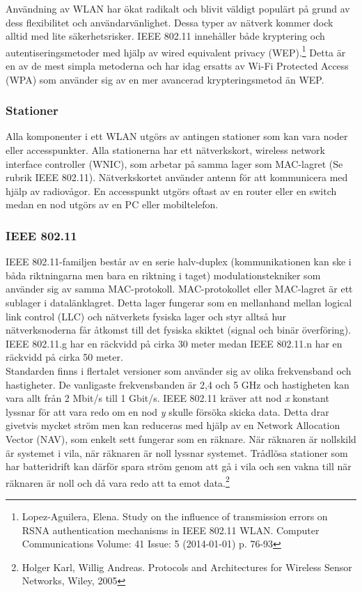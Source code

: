 \documentclass[a4paper,12pt,fleqn]{article}
\begin{document}
Användning av WLAN har ökat radikalt och blivit väldigt populärt på grund av dess flexibilitet och användarvänlighet. Dessa typer av nätverk kommer dock alltid med lite säkerhetsrisker. IEEE 802.11 innehåller både kryptering och autentiseringsmetoder med hjälp av wired equivalent privacy (WEP).\footnote{Lopez-Aguilera, Elena. Study on the influence of transmission errors on RSNA authentication mechanisms in IEEE 802.11 WLAN. Computer Communications Volume: 41 Issue: 5 (2014-01-01) p. 76-93} Detta är en av de mest simpla metoderna och har idag ersatts av  Wi-Fi Protected Access (WPA) som använder sig av en mer avancerad krypteringsmetod än WEP.

\subsubsection{Stationer}
Alla komponenter i ett WLAN utgörs av antingen stationer som kan vara noder eller accesspunkter. Alla stationerna har ett nätverkskort, wireless network interface controller (WNIC), som arbetar på samma lager som MAC-lagret (Se rubrik IEEE 802.11). Nätverkskortet använder antenn för att kommunicera med hjälp av radiovågor. En accesspunkt utgörs oftast av en router eller en switch medan en nod utgörs av en PC eller mobiltelefon.

\subsubsection{IEEE 802.11}
IEEE 802.11-familjen består av en serie halv-duplex (kommunikationen kan ske i båda riktningarna men bara en riktning i taget) modulationstekniker som använder sig av samma MAC-protokoll. MAC-protokollet eller MAC-lagret är ett sublager i datalänklagret. Detta lager fungerar som en mellanhand mellan logical link control (LLC) och nätverkets fysiska lager och styr alltså hur nätverksnoderna får åtkomst till det fysiska skiktet (signal och binär överföring). IEEE 802.11.g har en räckvidd på cirka 30 meter medan IEEE 802.11.n har en räckvidd på cirka 50 meter.
\\
\newline
Standarden finns i flertalet versioner som använder sig av olika frekvensband och hastigheter. De vanligaste frekvensbanden är 2,4 och 5 GHz och hastigheten kan vara allt från 2 Mbit/s till 1 Gbit/s. IEEE 802.11 kräver att nod \emph{x} konstant lyssnar för att vara redo om en nod \emph{y} skulle försöka skicka data. Detta drar givetvis mycket ström men kan reduceras med hjälp av en Network Allocation Vector (NAV), som enkelt sett fungerar som en räknare. När räknaren är nollskild är systemet i vila, när räknaren är noll lyssnar systemet. Trådlösa stationer som har batteridrift kan därför spara ström genom att gå i vila och sen vakna till när räknaren är noll och då vara redo att ta emot data.\footnote{Holger Karl, Willig Andreas. Protocols and Architectures for Wireless Sensor Networks, Wiley, 2005}
\end{document}
